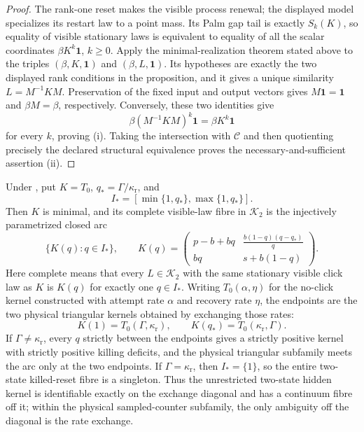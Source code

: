 \begin{proof}
The rank-one reset makes the visible process renewal; the displayed model
specializes its restart law to a point mass. Its Palm gap tail is
exactly \(S_k(K)\), so equality of visible stationary laws is equivalent to
equality of all the scalar coordinates \(\beta K^k\mathbf1\), \(k\ge0\).
Apply the minimal-realization theorem stated above to the triples
\((\beta,K,\mathbf1)\) and \((\beta,L,\mathbf1)\). Its hypotheses are exactly
the two displayed rank conditions in the proposition, and it gives a unique
similarity \(L=M^{-1}KM\). Preservation of the fixed input and output vectors
gives \(M\mathbf1=\mathbf1\) and \(\beta M=\beta\), respectively.
Conversely, these two identities give
\[
\beta(M^{-1}KM)^k\mathbf1=\beta K^k\mathbf1
\]
for every \(k\), proving (i). Taking the intersection with
\(\mathcal C\) and then quotienting precisely the declared structural
equivalence proves
the necessary-and-sufficient assertion (ii).
\end{proof}

\begin{theorem}
\label{thm:two-state-complete-fibre-arc-main}
Under , put \(K=T_0\),
\(q_\ast=\Gamma/\kappa_{\mathrm r}\), and
\[
 I_\ast=[\min\{1,q_\ast\},\max\{1,q_\ast\}].
\]
Then \(K\) is minimal, and its complete visible-law fibre in
\(\mathcal K_2\) is the injectively parametrized closed arc
\[
 \{K(q):q\in I_\ast\},
 \qquad
 K(q)=
 \begin{pmatrix}
 p-b+bq & \displaystyle\frac{b(1-q)(q-q_\ast)}q\\[5pt]
 bq & s+b(1-q)
 \end{pmatrix}.
 \tag{F1}
\]
Here complete means that every \(L\in\mathcal K_2\) with the same stationary
visible click law as \(K\) is \(K(q)\) for exactly one \(q\in I_\ast\).
Writing \(T_0(\alpha,\eta)\) for the no-click kernel constructed with attempt
rate \(\alpha\) and recovery rate \(\eta\), the endpoints are the two physical
triangular kernels obtained by exchanging those rates:
\[
 K(1)=T_0(\Gamma,\kappa_{\mathrm r}),
 \qquad
 K(q_\ast)=T_0(\kappa_{\mathrm r},\Gamma).
 \tag{F2}
\]
If \(\Gamma\ne\kappa_{\mathrm r}\), every \(q\) strictly between the
endpoints gives a strictly positive kernel with strictly positive killing
deficits, and the physical triangular subfamily meets the arc only at the two
endpoints.  If \(\Gamma=\kappa_{\mathrm r}\), then \(I_\ast=\{1\}\), so
the entire two-state killed-reset fibre is a singleton.  Thus the unrestricted
two-state hidden kernel is identifiable exactly on the exchange diagonal and
has a continuum fibre off it; within the physical sampled-counter subfamily,
the only ambiguity off the diagonal is the rate exchange.
\end{theorem}

